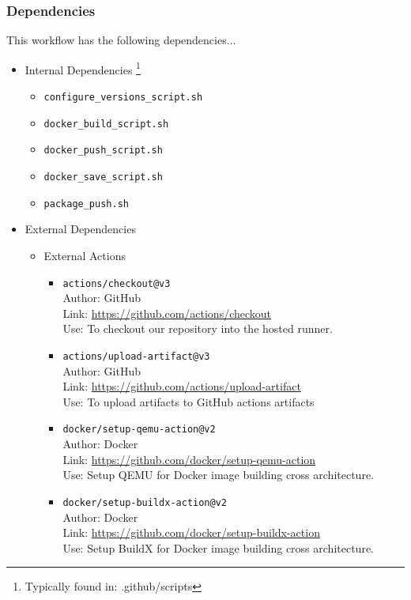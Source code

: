 \documentclass[a4paper,11pt]{article}
\begin{document}
\subsubsection{Dependencies}
This workflow has the following dependencies...
\begin{itemize}
    \item Internal Dependencies \footnote{Typically found in: .github/scripts}
    \begin{itemize}
        \item\verb|configure_versions_script.sh|
        \item\verb|docker_build_script.sh|
        \item\verb|docker_push_script.sh|
        \item\verb|docker_save_script.sh|
        \item\verb|package_push.sh|
    \end{itemize}
    \item External Dependencies
    \begin{itemize}
        \item External Actions
        \begin{itemize}
            \item\verb|actions/checkout@v3|\\Author: GitHub\\Link: \href{https://github.com/actions/checkout}{https://github.com/actions/checkout}\\Use: To checkout our repository into the hosted runner.
            \item\verb|actions/upload-artifact@v3|\\Author: GitHub\\Link: \href{https://github.com/actions/upload-artifact}{https://github.com/actions/upload-artifact}\\Use: To upload artifacts to GitHub actions artifacts
            \item\verb|docker/setup-qemu-action@v2|\\Author: Docker\\Link: \href{https://github.com/docker/setup-qemu-action}{https://github.com/docker/setup-qemu-action}\\Use: Setup QEMU for Docker image building cross architecture.
            \item\verb|docker/setup-buildx-action@v2|\\Author: Docker\\Link: \href{https://github.com/docker/setup-buildx-action}{https://github.com/docker/setup-buildx-action}\\Use: Setup BuildX for Docker image building cross architecture.

\end{itemize}
\end{itemize}
\end{itemize}
\end{document}

